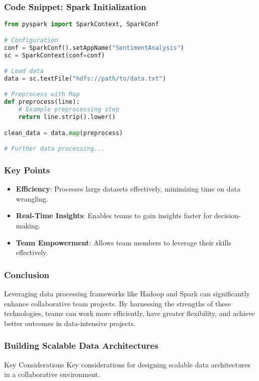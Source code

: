 \documentclass{beamer}
\begin{document}
\begin{frame}
    \frametitle{Code Snippet: Spark Initialization}
    \begin{lstlisting}[language=Python]
from pyspark import SparkContext, SparkConf

# Configuration
conf = SparkConf().setAppName("SentimentAnalysis")
sc = SparkContext(conf=conf)

# Load data
data = sc.textFile("hdfs://path/to/data.txt")

# Preprocess with Map
def preprocess(line):
    # Example preprocessing step
    return line.strip().lower()

clean_data = data.map(preprocess)

# Further data processing...
    \end{lstlisting}
\end{frame}

\begin{frame}
    \frametitle{Key Points}
    \begin{itemize}
        \item \textbf{Efficiency}: Processes large datasets effectively, minimizing time on data wrangling.
        \item \textbf{Real-Time Insights}: Enables teams to gain insights faster for decision-making.
        \item \textbf{Team Empowerment}: Allows team members to leverage their skills effectively.
    \end{itemize}
\end{frame}

\begin{frame}
    \frametitle{Conclusion}
    Leveraging data processing frameworks like Hadoop and Spark can significantly enhance collaborative team projects. 
    By harnessing the strengths of these technologies, teams can work more efficiently, have greater flexibility, and achieve better outcomes in data-intensive projects.
\end{frame}

\begin{frame}[fragile]
    \frametitle{Building Scalable Data Architectures}
    \begin{block}{Key Considerations}
        Key considerations for designing scalable data architectures in a collaborative environment.
    \end{block}
\end{frame}
\end{document}
